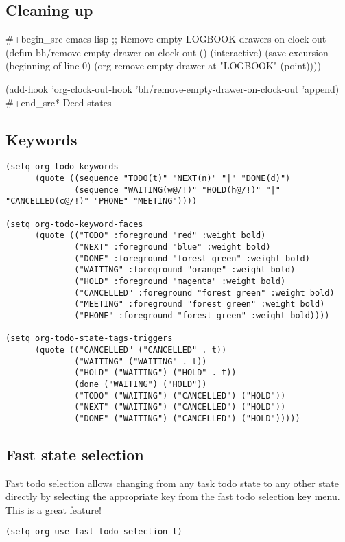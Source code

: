 \documentclass[11pt]{scrartcl}
\begin{document}
\subsection{Cleaning up}
\label{sec:orgheadline31}
\#+begin\_src emacs-lisp
;; Remove empty LOGBOOK drawers on clock out
(defun bh/remove-empty-drawer-on-clock-out ()
  (interactive)
  (save-excursion
    (beginning-of-line 0)
    (org-remove-empty-drawer-at "LOGBOOK" (point))))

(add-hook 'org-clock-out-hook 'bh/remove-empty-drawer-on-clock-out 'append)
\#+end\_src* Deed states
\subsection{Keywords}
\label{sec:orgheadline32}
\begin{verbatim}
(setq org-todo-keywords
      (quote ((sequence "TODO(t)" "NEXT(n)" "|" "DONE(d)")
              (sequence "WAITING(w@/!)" "HOLD(h@/!)" "|" "CANCELLED(c@/!)" "PHONE" "MEETING"))))

(setq org-todo-keyword-faces
      (quote (("TODO" :foreground "red" :weight bold)
              ("NEXT" :foreground "blue" :weight bold)
              ("DONE" :foreground "forest green" :weight bold)
              ("WAITING" :foreground "orange" :weight bold)
              ("HOLD" :foreground "magenta" :weight bold)
              ("CANCELLED" :foreground "forest green" :weight bold)
              ("MEETING" :foreground "forest green" :weight bold)
              ("PHONE" :foreground "forest green" :weight bold))))

(setq org-todo-state-tags-triggers
      (quote (("CANCELLED" ("CANCELLED" . t))
              ("WAITING" ("WAITING" . t))
              ("HOLD" ("WAITING") ("HOLD" . t))
              (done ("WAITING") ("HOLD"))
              ("TODO" ("WAITING") ("CANCELLED") ("HOLD"))
              ("NEXT" ("WAITING") ("CANCELLED") ("HOLD"))
              ("DONE" ("WAITING") ("CANCELLED") ("HOLD")))))
\end{verbatim}

\subsection{Fast state selection}
\label{sec:orgheadline33}
Fast todo selection allows changing from any task todo state to any
other state directly by selecting the appropriate key from the fast
todo selection key menu.  This is a great feature!

\begin{verbatim}
(setq org-use-fast-todo-selection t)
\end{verbatim}
\end{document}
